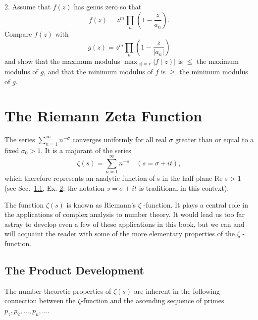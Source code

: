 2. Assume that $f(z)$ has genus zero so that
\begin{equation*}
f (z) = z ^ {m} \prod_ {n} \left(1 - \frac {z}{a _ {n}}\right).
\end{equation*}
Compare $f(z)$ with
\begin{equation*}
g (z) = z ^ {m} \prod_ {n} \left(1 - \frac {z}{| a _ {n} |}\right)
\end{equation*}
and show that the maximum modulus $\max_{|z|=r}|f(z)|$ is $\leq$ the maximum modulus of $g$, and that the minimum modulus of $f$ is $\geq$ the minimum modulus of $g$.

\setcounter{section}{3}\section{The Riemann Zeta Function}\label{sec:5.4}
The series $\sum_{n=1}^{\infty} n^{-\sigma}$ converges uniformly for all real $\sigma$ greater than or equal to a fixed $\sigma_0 > 1$. It is a majorant of the series
\begin{equation*}
\zeta (s) = \sum_ {n = 1} ^ {\infty} n ^ {- s} \quad (s = \sigma + i t),\tag{55}\label{eq:5.55}
\end{equation*}
which therefore represents an analytic function of s in the half plane Re s > 1 (see Sec.~\hyperref[sec:5.1.1]{1.1}, Ex. \hyperref[exercise:5.1.1.1.2]{2}; the notation $s = \sigma + it$ is traditional in this context).

The function $\zeta(s)$ is known as Riemann's $\zeta$ -function. It plays a central role in the applications of complex analysis to number theory. It would lead us too far astray to develop even a few of these applications in this book, but we can and will acquaint the reader with some of the more elementary properties of the $\zeta$ -function.


\setcounter{section}{4}\setcounter{subsection}{0}\subsection{The Product Development}\label{sec:5.4.1}
The number-theoretic properties of $\zeta(s)$ are inherent in the following connection between the $\zeta$-function and the ascending sequence of primes $p_1, p_2, \ldots, p_n, \ldots$.

